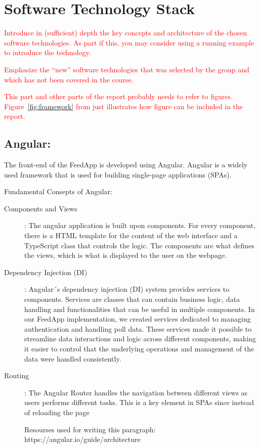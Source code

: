 \section{Software Technology Stack}
\label{sec:technology}

\textcolor{red}{Introduce in (sufficient) depth the key concepts and architecture of the chosen software technologies. As part if this, you may consider using a running example to introduce the technology.}

\textcolor{red}{Emphasize the “new” software technologies that was selected by the group and which has not been covered in the course.}

\textcolor{red}{This part and other parts of the report probably needs to refer to
figures. Figure~\ref{fig:framework} from \cite{brown:96} just
illustrates how figure can be included in the report.}

\subsection{Angular:}
The front-end of the FeedApp is developed using Angular. Angular is a widely used framework that is used for building single-page applications (SPAs).

Fundamental Consepts of Angular: 
\begin{description}
\item[Components and Views]: The angular application is built upon components. For every component, there is a HTML template for the content of the web interface and a TypeScript class that controls the logic. The components are what defines the views, which is what  is displayed to the user on the webpage. 
\item[Dependency Injection (DI)]: Angular´s dependency injection (DI) system provides services to components. Services are classes that can contain business logic, data handling and functionalities that can be useful in multiple components. In our FeedApp implementation, we created services dedicated to managing authentication and handling poll data. These services made it possible to streamline data interactions and logic across different components, making it easier to control that the underlying operations and management of the data were handled consistently. 
\item[Routing]: The Angular Router handles the navigation between different views as users performs different tasks. This is a key element in SPAs since instead of reloading the page

Resourses used for writing this paragraph: https://angular.io/guide/architecture 
\end{description}

